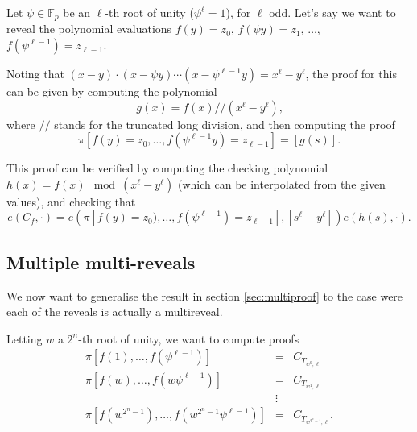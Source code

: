 \documentclass[a4paper]{article}
\begin{document}
Let $\psi\in\mathbb{F}_p$ be an $\ell$-th root of unity ($\psi^\ell=1$), for $\ell$ odd. Let's say we want to reveal the polynomial evaluations $f(y) = z_0$, $f(\psi y) = z_1$, $\ldots$, $f(\psi^{\ell-1})=z_{\ell - 1}$.

Noting that $(x-y)\cdot(x-\psi y) \cdots (x - \psi^{\ell-1} y) = x^\ell - y^\ell$, the proof for this can be given by computing the polynomial
\begin{equation}
g(x) = f(x) // (x^\ell - y^\ell)\text{,}
\end{equation}
where $//$ stands for the truncated long division, and then computing the proof
\begin{equation}
     \pi[f(y) = z_0, \ldots, f(\psi^{\ell-1}y)=z_{\ell - 1}] = [g(s)] \text{.}
\end{equation}

This proof can be verified by computing the checking polynomial $h(x) = f(x) \mod (x^\ell - y^\ell)$ (which can be interpolated from the given values), and checking that
\begin{equation}
e(C_f, \cdot) = e(\pi[f(y) = z_0), \ldots, f(\psi^{\ell-1})=z_{\ell - 1}], [s^\ell - y^\ell]) e(h(s),\cdot) \text{.}
\end{equation}

\subsection{Multiple multi-reveals}

We now want to generalise the result in section \ref{sec:multiproof} to the case were each of the reveals is actually a multireveal.

Letting $w$ a $2^n$-th root of unity, we want to compute proofs
\begin{eqnarray}
     \pi[f(1), \ldots, f(\psi^{\ell-1})] &=& C_{T_{w^0, \ell}} \\
     \pi[f(w), \ldots, f(w\psi^{\ell-1})] &=& C_{T_{w^1, \ell}} \\
     &\vdots& \nonumber \\
     \pi[f(w^{2^n-1}), \ldots, f(w^{2^n-1}\psi^{\ell-1})] &=& C_{T_{w^{2^n-1}, \ell}} \text{.}
\end{eqnarray}
\end{document}
